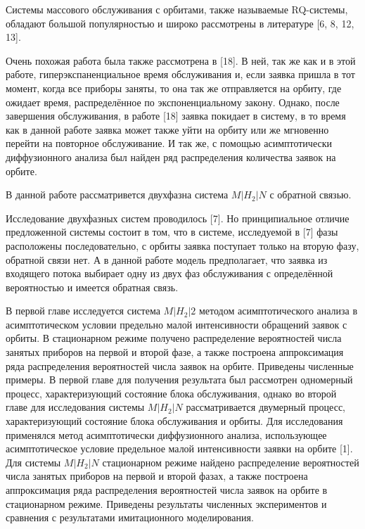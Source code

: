 \hspace*{\parindent}%
Системы массового обслуживания с орбитами, также называемые RQ-системы, обладают большой популярностью и широко рассмотрены в литературе [6, 8, 12, 13]. 

Очень похожая работа была также рассмотрена в [18]. В ней, так же как и в этой работе, гиперэкспаненциальное время обслуживания и, если заявка пришла в тот момент, когда все приборы заняты, то она так же отправляется на орбиту, где ожидает время, распределённое по экспоненциальному закону. Однако, после завершения обслуживания, в работе [18] заявка покидает в систему, в то время как в данной работе заявка может также уйти на орбиту или же мгновенно перейти на повторное обслуживание. И так же, с помощью асимптотически диффузионного анализа был найден ряд распределения количества заявок на орбите.


В данной работе рассматривется двухфазна система $M|H_{2}|N$ с обратной связью.

Исследование двухфазных систем проводилось [7]. Но принципиальное отличие предложенной системы состоит в том, что в системе, исследуемой в [7] фазы расположены последовательно, с орбиты заявка поступает только на вторую фазу, обратной связи нет. А в данной работе модель предполагает, что заявка из входящего потока выбирает одну из двух фаз обслуживания с определённой вероятностью и имеется обратная связь.

В первой главе исследуется система $M|H_{2}|2$ методом асимптотического анализа в асимптотическом условии предельно малой интенсивности обращений заявок с орбиты. В стационарном режиме получено распределение вероятностей числа занятых приборов на первой и второй фазе, а также построена аппроксимация ряда распределения вероятностей числа заявок на орбите. Приведены численные примеры.
В первой главе для получения результата был рассмотрен одномерный процесс, характеризующий состояние блока обслуживания, однако во второй главе для исследования системы $M|H_{2}|N$ рассматривается двумерный процесс, характеризующий состояние блока обслуживания и орбиты. Для исследования применялся метод асимптотически диффузионного анализа, использующее асимптотическое условие предельное малой интенсивности заявки на орбите [1].
Для системы $M|H_{2}|N$ стационарном режиме найдено распределение вероятностей числа занятых приборов на первой и второй фазах, а также построена аппроксимация ряда распределения вероятностей числа заявок на орбите в стационарном режиме. Приведены результаты численных экспериментов и сравнения с результатами имитационного моделирования.



